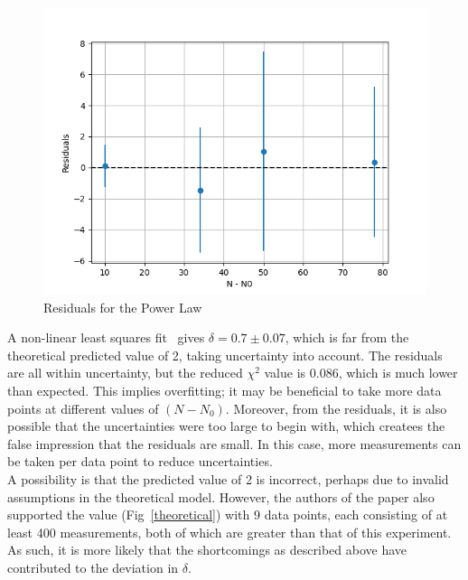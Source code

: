 \documentclass[12pt]{IEEEtran}
\begin{document}
\begin{figure}[h]
    \centering
    \includegraphics[scale=0.5]{part1_res.png}
    \caption{Residuals for the Power Law}
\end{figure}

A non-linear least squares fit~\cite{curvefit} gives $\delta = 0.7 \pm 0.07$, which is far from the theoretical predicted value of 2, taking uncertainty into account. The residuals are all within uncertainty, but the reduced $\chi^2$ value is $0.086$, which is much lower than expected. This implies overfitting; it may be beneficial to take more data points at different values of $(N - N_0)$. Moreover, from the residuals, it is also possible that the uncertainties were too large to begin with, which createes the false impression that the residuals are small. In this case, more measurements can be taken per data point to reduce uncertainties. \\
A possibility is that the predicted value of 2 is incorrect, perhaps due to invalid assumptions in the theoretical model. However, the authors of the paper also supported the value (Fig~\ref{theoretical}) with 9 data points, each consisting of at least 400 measurements, both of which are greater than that of this experiment. As such, it is more likely that the shortcomings as described above have contributed to the deviation in $\delta$.
\end{document}
